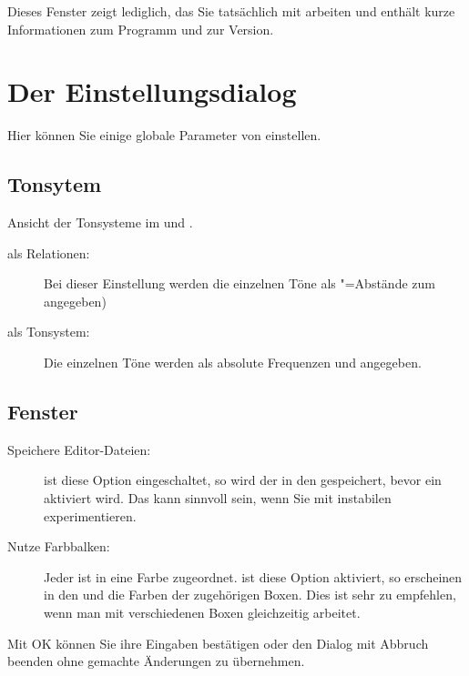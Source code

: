 Dieses Fenster zeigt lediglich, das Sie tatsächlich mit \mutabor{} 
arbeiten und enthält kurze Informationen zum Programm und zur 
Version.

\section{Der Einstellungsdialog}\label{sec:DE_SETUP}
Hier können Sie einige globale Parameter von \mutabor{} einstellen.


\subsection{Tonsytem}
Ansicht der Tonsysteme im
 und
.
\begin{description}
\item[als Relationen:] Bei dieser Einstellung werden
  die einzelnen Töne als "=Abstände zum
   angegeben)
\item[als Tonsystem:] Die einzelnen Töne werden als
  absolute Frequenzen und 
  angegeben.
\end{description}

\subsection{Fenster}
\begin{description}
\item[Speichere Editor-Dateien:] ist diese Option
  eingeschaltet, so wird der  in
  den  gespeichert, bevor ein
   aktiviert wird.  Das
  kann sinnvoll sein, wenn Sie mit instabilen
   experimentieren.
\item[Nutze Farbbalken:] Jeder
   ist in \mutabor{} eine Farbe zugeordnet.
  ist diese Option aktiviert, so erscheinen in den
   und
   die Farben der
  zugehörigen Boxen. Dies ist sehr zu empfehlen, wenn man mit
  verschiedenen Boxen gleichzeitig arbeitet.
\end{description}

Mit OK können Sie ihre Eingaben bestätigen oder den Dialog 
mit Abbruch beenden ohne gemachte Änderungen zu übernehmen.





